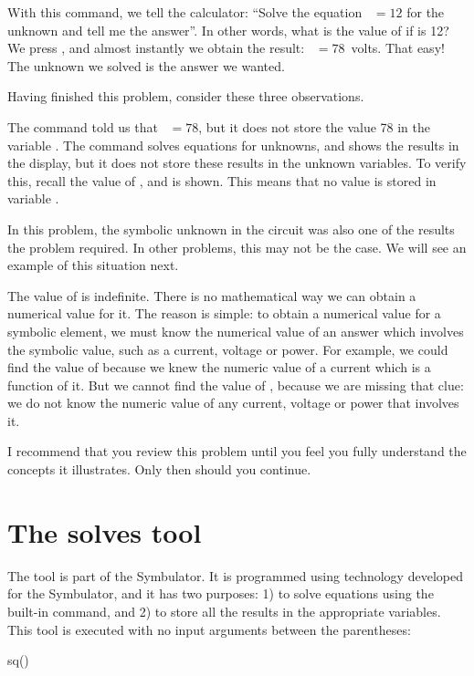 With this command, we tell the calculator: ``Solve the equation
~$= 12$ for the unknown  and tell me the
answer''. In other words, what is the value of  if
 is 12? We press , and almost instantly we
obtain the result: ~$= 78$~volts. That easy! The unknown we
solved is the answer we wanted.

Having finished this problem, consider these three observations.

The  command told us that ~$= 78$, but it does
not store the value 78 in the variable . The 
command solves equations for unknowns, and shows the results in the
display, but it does not store these results in the unknown
variables. To verify this, recall the value of , and
 is shown. This means that no value is stored in variable
.

In this problem, the symbolic unknown in the circuit was also one of
the results the problem required. In other problems, this may not be
the case. We will see an example of this situation next.

The value of  is indefinite. There is no mathematical way
we can obtain a numerical value for it. The reason is simple: to
obtain a numerical value for a symbolic element, we must know the
numerical value of an answer which involves the symbolic value, such
as a current, voltage or power. For example, we could find the value
of  because we knew the numeric value of a current which is
a function of it. But we cannot find the value of , because
we are missing that clue: we do not know the numeric value of any
current, voltage or power that involves it.

I recommend that you review this problem until you feel you fully
understand the concepts it illustrates. Only then should you
continue.

\section{The solves tool}

The  tool is part of the Symbulator. It is programmed
using technology developed for the Symbulator, and it has two
purposes: 1) to solve equations using the built-in 
command, and 2) to store all the results in the appropriate
variables. This tool is executed with no input arguments between the
parentheses:

\begin{entry}
sq\solves()
\end{entry}

